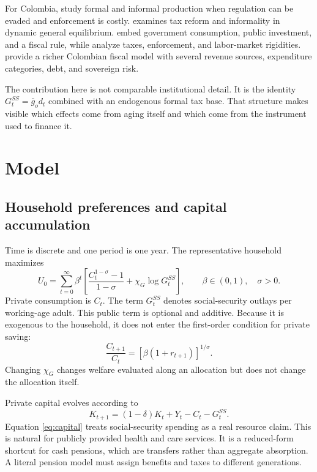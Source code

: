 \documentclass[12pt]{article}
\begin{document}
For Colombia, \citet{MejiaPosada2007} study formal and informal production when
regulation can be evaded and enforcement is costly. \citet{Osorio2016}
examines tax reform and informality in dynamic general equilibrium.
\citet{Rincon2017} embed government consumption, public investment, and a
fiscal rule, while \citet{GrandaMorales2023} analyze taxes, enforcement, and
labor-market rigidities. \citet{Herrera2025} provide a richer Colombian fiscal
model with several revenue sources, expenditure categories, debt, and
sovereign risk.

The contribution here is not comparable institutional detail. It is the
identity $G_t^{SS}=\bar g_o d_t$ combined with an endogenous formal tax base.
That structure makes visible which effects come from aging itself and which
come from the instrument used to finance it.

\section{Model}

\subsection{Household preferences and capital accumulation}

Time is discrete and one period is one year. The representative household
maximizes
\begin{equation}
  U_0=
  \sum_{t=0}^{\infty}\beta^t
  \left[
    \frac{C_t^{1-\sigma}-1}{1-\sigma}
    +\chi_G\log G_t^{SS}
  \right],
  \qquad
  \beta\in(0,1),\quad \sigma>0.
  \label{eq:utility}
\end{equation}
Private consumption is $C_t$. The term $G_t^{SS}$ denotes social-security
outlays per working-age adult. This public term is optional and additive.
Because it is exogenous to the household, it does not enter the first-order
condition for private saving:
\begin{equation}
  \frac{C_{t+1}}{C_t}
  =
  \left[\beta(1+r_{t+1})\right]^{1/\sigma}.
  \label{eq:euler}
\end{equation}
Changing $\chi_G$ changes welfare evaluated along an allocation but does not
change the allocation itself.

Private capital evolves according to
\begin{equation}
  K_{t+1}
  =
  (1-\delta)K_t+Y_t-C_t-G_t^{SS}.
  \label{eq:capital}
\end{equation}
Equation \eqref{eq:capital} treats social-security spending as a real resource
claim. This is natural for publicly provided health and care services. It is a
reduced-form shortcut for cash pensions, which are transfers rather than
aggregate absorption. A literal pension model must assign benefits and taxes
to different generations.
\end{document}
